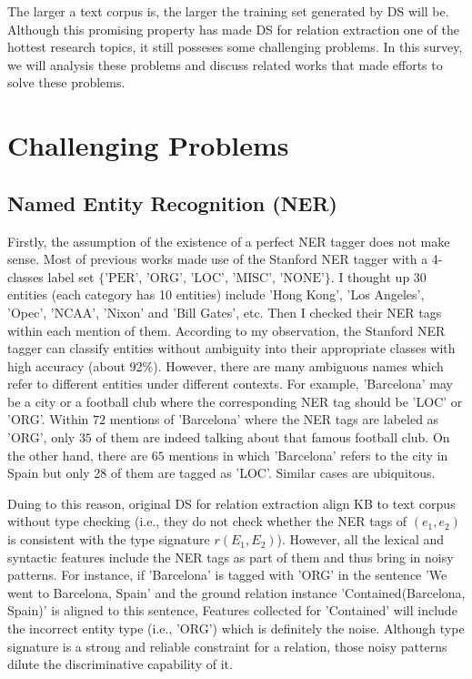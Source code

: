 \documentclass[10pt]{article} %
\theoremstyle{definition}
\theoremstyle{definition}
\begin{document}
The larger a text corpus is, the larger the training set generated by DS will be. 
Although this promising property has made DS for relation extraction one of the hottest research topics, it still posseses some challenging problems. 
In this survey, we will analysis these problems and discuss related works that made efforts to solve these problems. 



\section{Challenging Problems}
\subsection{Named Entity Recognition (NER)}
Firstly, the assumption of the existence of a perfect NER tagger does not make sense. 
Most of previous works made use of the Stanford NER tagger with a 4-classes label set $\{\text{'PER', 'ORG', 'LOC', 'MISC', 'NONE'}\}$. 
I thought up 30 entities (each category has 10 entities) include 'Hong Kong', 'Los Angeles', 'Opec', 'NCAA', 'Nixon' and 'Bill Gates', etc. 
Then I checked their NER tags within each mention of them. 
According to my observation, the Stanford NER tagger can classify entities without ambiguity into their appropriate classes with high accuracy (about 92\%). 
However, there are many ambiguous names which refer to different entities under different contexts. 
For example, 'Barcelona' may be a city or a football club where the corresponding NER tag should be 'LOC' or 'ORG'. 
Within $72$ mentions of 'Barcelona' where the NER tags are labeled as 'ORG', only $35$ of them are indeed talking about that famous football club. 
On the other hand, there are $65$ mentions in which 'Barcelona' refers to the city in Spain but only 28 of them are tagged as 'LOC'. 
Similar cases are ubiquitous. 



Duing to this reason, original DS for relation extraction align KB to text corpus without type checking 
(i.e., they do not check whether the NER tags of $(e_1,e_2)$ is consistent with the type signature $r(E_1,E_2)$). 
However, all the lexical and syntactic features include the NER tags as part of them and thus bring in noisy patterns. 
For instance, if 'Barcelona' is tagged with 'ORG' in the sentence 'We went to Barcelona, Spain' and the ground relation instance 'Contained(Barcelona, Spain)' is aligned to this sentence, 
Features collected for 'Contained' will include the incorrect entity type (i.e., 'ORG') which is definitely the noise. 
Although type signature is a strong and reliable constraint for a relation, those noisy patterns dilute the discriminative capability of it. 
\end{document}
